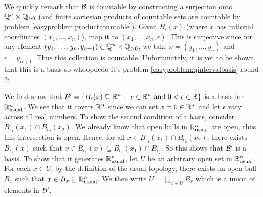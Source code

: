 \documentclass{article}
\begin{document}
 {
    We quickly remark that $\mathcal{B}$ is countable by constructing a surjection onto $\mathbb{Q}^{n}\times \mathbb{Q}_{> 0}$ (and finite cartesian products of countable sets are countable by problem \ref{easyproblem:productcountable}). Given $B_{\epsilon}(x)$ (where $x$ has rational coordinates $(x_{1},\dots, x_{n})$), map it to $(x_{1},\dots, x_{n}, \epsilon)$. This is surjective since for any element $(y_{1},\dots, y_{n}, y_{n+1})\in \mathbb{Q}^{n}\times \mathbb{Q}_{> 0}$, we take $x = (y_{1},\dots, y_{n})$ and $\epsilon = y_{n+1}$. Thus this collection is countable. Unfortunately, it is yet to be shown that this is a basis so whoopdedo it's problem \ref{easyproblem:qintervalbasis} round 2:

    We first show that $\mathcal{B}' = \{ B_{\epsilon}(x) \subseteq \mathbb{R}^{n}:\ x \in \mathbb{R}^{n}\text{ and } 0 < \epsilon \in \mathbb{R} \}$ is a basis for $\mathbb{R}_{\text{usual}}^{n}$. We see that it covers $\mathbb{R}^{n}$ since we can set $x = 0\in \mathbb{R}^{n}$ and let $\epsilon$ vary across all real numbers. To show the second condition of a basis, consider $B_{\epsilon_{1}}(x_{1})\cap B_{\epsilon_{2}}(x_{2})$. We already know that open balls in $\mathbb{R}_{\text{usual}}^{n}$ are open, thus this intersection is open. Hence, for all $x\in B_{\epsilon_{1}}(x_{1})\cap B_{\epsilon_{2}}(x_{2})$, there exists $B_{\epsilon_{3}}(x)$ such that $x\in B_{\epsilon_{3}}(x)\subseteq B_{\epsilon_{1}}(x_{1})\cap B_{\epsilon_{2}}$. So this shows that $\mathcal{B}'$ is a basis. To show that it generates $\mathbb{R}_{\text{usual}}^{n}$, let $U$ be an arbitrary open set in $\mathbb{R}_{\text{usual}}^{n}$. For each $x\in U$, by the definition of the usual topology, there exists an open ball $B_{x}$ such that $x\in B_{x}\subseteq \mathbb{R}_{\text{usual}}^{n}$. We then write $U = \bigcup_{x\in U}B_{x}$ which is a union of elements in $\mathcal{B}'$.

}
\end{document}
